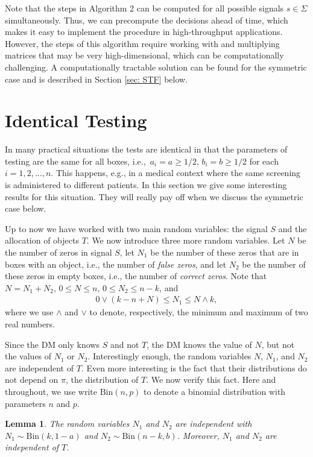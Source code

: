 \documentclass[a4paper,11pt]{article}
\newtheorem{lemma}{Lemma}
\begin{document}
Note that the steps in Algorithm 2  can be computed for all possible signals $s\in \Sigma$ simultaneously. Thus, we can precompute the decisions ahead of time, which makes it easy to implement the procedure in high-throughput applications. However, the steps of this algorithm require working with and multiplying matrices that may be very high-dimensional, which can be computationally challenging. A computationally tractable solution can be found for the symmetric case and is described in Section \ref{sec: STF} below.

\section{Identical Testing}\label{sec: ident test}

In many practical situations the tests are identical in that the parameters of testing are the same for all boxes, i.e.,\ $a_i=a\ge1/2$, $b_i=b\ge1/2$ for each $i=1,2,\dots,n$. This happens, e.g., in a medical context where the same screening is administered to different patients. In this section we give some interesting results for this situation. They will really pay off when we discuss the symmetric case below.

Up to now we have worked with two main random variables: the signal $S$ and the allocation of objects $T$. We now introduce three more random variables. Let $N$ be the number of zeros in signal $S$, let $N_1$ be the number of these zeros that are in boxes with an object, i.e., the number of {\em false zeros}, and let $N_2$ be the number of these zeros in empty boxes, i.e., the number of {\em correct zeros}. Note that $N= N_1 + N_2$, $0\le N\le n$, $0\le N_2\le n-k$, and
\begin{eqnarray}\label{eq: bound on N1}
0\vee\left(k-n+N\right)\le N_1\le N\wedge k,
\end{eqnarray}
where we use $\wedge$ and $\vee$ to denote, respectively, the minimum and maximum of two real numbers. 

Since the DM only knows $S$ and not $T$, the DM knows the value of $N$, but not the values of $N_1$ or $N_2$. Interestingly enough, the random variables $N$, $N_1$, and $N_2$ are independent of $T$. Even more interesting is the fact that their distributions do not depend on $\pi$, the distribution of $T$. We now verify this fact. Here and throughout, we use write $\mathrm{Bin}(n,p)$ to denote a binomial distribution with parameters $n$ and $p$.

\begin{lemma}
The random variables $N_1$ and $N_2$ are independent with $N_1\sim \mathrm{Bin}(k,1-a)$ and $N_2 \sim \mathrm{Bin}(n-k,b)$. Moreover, $N_1$ and $N_2$ are independent of $T$.
\end{lemma}
\end{document}
